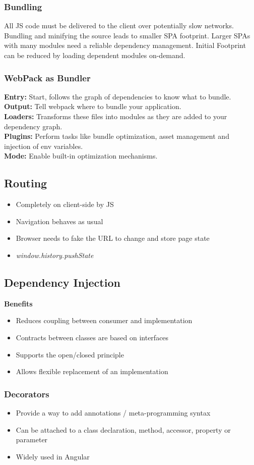 \subsubsection{Bundling}
All JS code must be delivered to the client over potentially slow networks.
Bundling and minifying the source leads to smaller SPA footprint.
Larger SPAs with many modules need a reliable dependency management.
Initial Footprint can be reduced by loading dependent modules on-demand.

\subsubsection{WebPack as Bundler}
\textbf{Entry:} Start, follows the graph of dependencies to know what to bundle.\\
\textbf{Output:} Tell webpack where to bundle your application.\\
\textbf{Loaders:} Transforms these files into modules as they are added to your dependency graph.\\
\textbf{Plugins:} Perform tasks like bundle optimization, asset management and injection of env variables.\\
\textbf{Mode:} Enable built-in optimization mechanisms.

\subsection{Routing}
\begin{itemize}
    \item Completely on client-side by JS
    \item Navigation behaves as usual
    \item Browser needs to fake the URL to change and store page state
    \item \textit{window.history.pushState}
\end{itemize}

\subsection{Dependency Injection}
\textbf{Benefits}
\begin{itemize}
    \item Reduces coupling between consumer and implementation
    \item Contracts between classes are based on interfaces
    \item Supports the open/closed principle
    \item Allows flexible replacement of an implementation
\end{itemize}

\subsubsection{Decorators}
\begin{itemize}
    \item Provide a way to add annotations / meta-programming syntax
    \item Can be attached to a class declaration, method, accessor, property or parameter
    \item Widely used in Angular
\end{itemize}